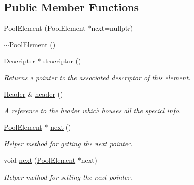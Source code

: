 \subsection*{Public Member Functions}
\begin{DoxyCompactItemize}
\item 
\hyperlink{classtervel_1_1util_1_1memory_1_1rc_1_1_pool_element_a172c3d0063e2ade9a3cfc8cb11287061}{Pool\+Element} (\hyperlink{classtervel_1_1util_1_1memory_1_1rc_1_1_pool_element}{Pool\+Element} $\ast$\hyperlink{classtervel_1_1util_1_1memory_1_1rc_1_1_pool_element_a2ac432791b8b1d4cba1734a4e3bd7fef}{next}=nullptr)
\item 
\hyperlink{classtervel_1_1util_1_1memory_1_1rc_1_1_pool_element_a52629cac14fdc7e9df441fa28b4d60fc}{$\sim$\+Pool\+Element} ()
\item 
\hyperlink{classtervel_1_1util_1_1_descriptor}{Descriptor} $\ast$ \hyperlink{classtervel_1_1util_1_1memory_1_1rc_1_1_pool_element_ad84ff081d680dd280253e3580fac2561}{descriptor} ()
\begin{DoxyCompactList}\small\item\em Returns a pointer to the associated descriptor of this element. \end{DoxyCompactList}\item 
\hyperlink{structtervel_1_1util_1_1memory_1_1rc_1_1_pool_element_1_1_header}{Header} \& \hyperlink{classtervel_1_1util_1_1memory_1_1rc_1_1_pool_element_a51242ff566f53c56978fb396005e41ad}{header} ()
\begin{DoxyCompactList}\small\item\em A reference to the header which houses all the special info. \end{DoxyCompactList}\item 
\hyperlink{classtervel_1_1util_1_1memory_1_1rc_1_1_pool_element}{Pool\+Element} $\ast$ \hyperlink{classtervel_1_1util_1_1memory_1_1rc_1_1_pool_element_a2ac432791b8b1d4cba1734a4e3bd7fef}{next} ()
\begin{DoxyCompactList}\small\item\em Helper method for getting the next pointer. \end{DoxyCompactList}\item 
void \hyperlink{classtervel_1_1util_1_1memory_1_1rc_1_1_pool_element_a9e6409cf32a8f23769951b034ad5974a}{next} (\hyperlink{classtervel_1_1util_1_1memory_1_1rc_1_1_pool_element}{Pool\+Element} $\ast$next)
\begin{DoxyCompactList}\small\item\em Helper method for setting the next pointer. \end{DoxyCompactList}\item 

\end{DoxyCompactItemize}
